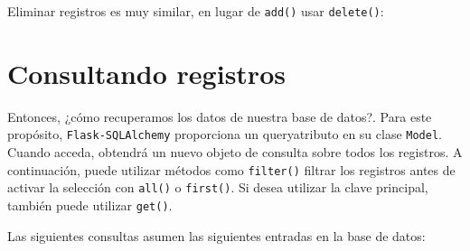 \documentclass[11pt,letterpaper,notumble]{leaflet}
\begin{document}
		Eliminar registros es muy similar, en lugar de \texttt{add()} usar \texttt{delete()}:
		    
		
		    
		\vspace*{-0.4cm}
		    
		\section{Consultando registros}
		    
		Entonces, ¿cómo recuperamos los datos de nuestra base de datos?. Para este propósito, \texttt{Flask-SQLAlchemy} proporciona un queryatributo en su clase \texttt{Model}. Cuando acceda, obtendrá un nuevo objeto de consulta sobre todos los registros. A continuación, puede utilizar métodos como \texttt{filter()} filtrar los registros antes de activar la selección con \texttt{all()} o \texttt{first()}. Si desea utilizar la clave principal, también puede utilizar \texttt{get()}.
		
		Las siguientes consultas asumen las siguientes entradas en la base de datos:
	
\end{document}
